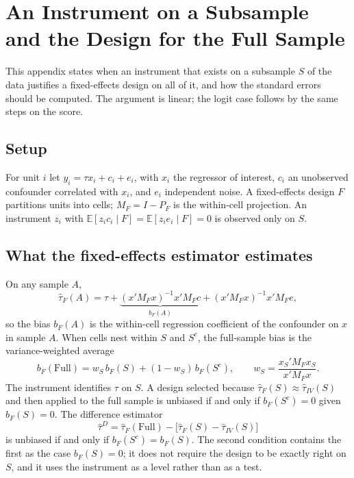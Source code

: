 \section{An Instrument on a Subsample and the Design for the Full Sample}\label{appendix:ivvalidation}

This appendix states when an instrument that exists on a subsample $S$ of the data justifies a fixed-effects design on all of it, and how the standard errors should be computed. The argument is linear; the logit case follows by the same steps on the score.

\subsection{Setup}
For unit $i$ let $y_i = \tau x_i + c_i + e_i$, with $x_i$ the regressor of interest, $c_i$ an unobserved confounder correlated with $x_i$, and $e_i$ independent noise. A fixed-effects design $F$ partitions units into cells; $M_F = I - P_F$ is the within-cell projection. An instrument $z_i$ with $\mathbb{E}[z_i c_i \mid F] = \mathbb{E}[z_i e_i \mid F] = 0$ is observed only on $S$.

\subsection{What the fixed-effects estimator estimates}
On any sample $A$,
\begin{equation}
\hat\tau_F(A) = \tau + \underbrace{(x'M_F x)^{-1}x'M_F c}_{b_F(A)} + (x'M_F x)^{-1}x'M_F e,
\end{equation}
so the bias $b_F(A)$ is the within-cell regression coefficient of the confounder on $x$ in sample $A$. When cells nest within $S$ and $S^c$, the full-sample bias is the variance-weighted average
\begin{equation}\label{eq:biasavg}
b_F(\text{Full}) = w_S\, b_F(S) + (1 - w_S)\, b_F(S^c), \qquad w_S = \frac{x_S' M_F x_S}{x'M_F x}.
\end{equation}
The instrument identifies $\tau$ on $S$. A design selected because $\hat\tau_F(S) \approx \hat\tau_{IV}(S)$ and then applied to the full sample is unbiased if and only if $b_F(S^c) = 0$ given $b_F(S) = 0$. The difference estimator
\begin{equation}\label{eq:diffapp}
\hat\tau^{D} = \hat\tau_F(\text{Full}) - \big[\hat\tau_F(S) - \hat\tau_{IV}(S)\big]
\end{equation}
is unbiased if and only if $b_F(S^c) = b_F(S)$. The second condition contains the first as the case $b_F(S) = 0$; it does not require the design to be exactly right on $S$, and it uses the instrument as a level rather than as a test.

